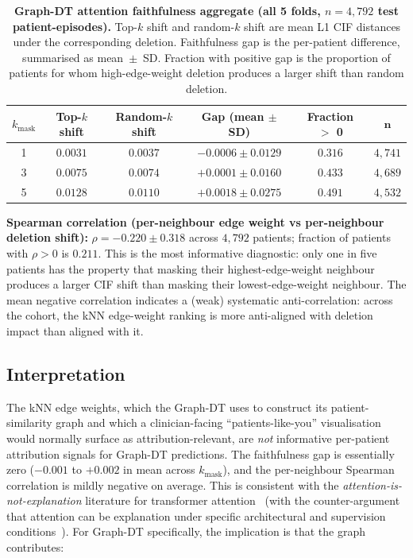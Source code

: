 \documentclass[11pt]{article}
\begin{document}
\begin{table}[h!]
\centering
\caption{\textbf{Graph-DT attention faithfulness aggregate (all 5 folds, $n{=}4{,}792$ test patient-episodes).} Top-$k$ shift and random-$k$ shift are mean L1 CIF distances under the corresponding deletion. Faithfulness gap is the per-patient difference, summarised as mean~$\pm$~SD. Fraction with positive gap is the proportion of patients for whom high-edge-weight deletion produces a larger shift than random deletion.}
\label{tab:s_wsp315_aggregate}
\begin{tabular}{cccccc}
\toprule
\textbf{$k_\mathrm{mask}$} & \textbf{Top-$k$ shift} & \textbf{Random-$k$ shift} & \textbf{Gap (mean $\pm$ SD)} & \textbf{Fraction $>$ 0} & $\mathbf{n}$ \\
\midrule
1 & $0.0031$ & $0.0037$ & $-0.0006 \pm 0.0129$ & $0.316$ & $4{,}741$ \\
3 & $0.0075$ & $0.0074$ & $+0.0001 \pm 0.0160$ & $0.433$ & $4{,}689$ \\
5 & $0.0128$ & $0.0110$ & $+0.0018 \pm 0.0275$ & $0.491$ & $4{,}532$ \\
\bottomrule
\end{tabular}
\end{table}

\noindent \textbf{Spearman correlation (per-neighbour edge weight vs per-neighbour deletion shift):} $\rho = -0.220 \pm 0.318$ across $4{,}792$ patients; fraction of patients with $\rho > 0$ is $0.211$. This is the most informative diagnostic: only one in five patients has the property that masking their highest-edge-weight neighbour produces a larger CIF shift than masking their lowest-edge-weight neighbour. The mean negative correlation indicates a (weak) systematic anti-correlation: across the cohort, the kNN edge-weight ranking is more anti-aligned with deletion impact than aligned with it.

\subsection*{Interpretation}

The kNN edge weights, which the Graph-DT uses to construct its patient-similarity graph and which a clinician-facing ``patients-like-you'' visualisation would normally surface as attribution-relevant, are \emph{not} informative per-patient attribution signals for Graph-DT predictions. The faithfulness gap is essentially zero ($-0.001$ to $+0.002$ in mean across $k_\mathrm{mask}$), and the per-neighbour Spearman correlation is mildly negative on average. This is consistent with the \emph{attention-is-not-explanation} literature for transformer attention~\cite{jain2019attention} (with the counter-argument that attention can be explanation under specific architectural and supervision conditions~\cite{wiegreffe2019attention}). For Graph-DT specifically, the implication is that the graph contributes:
\end{document}

